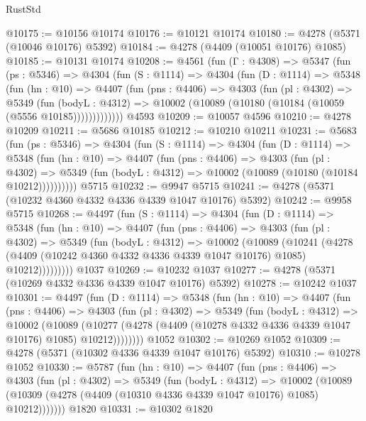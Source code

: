 \begin{lexlean}{RustStd}
\begin{coremodule}
{\begin{coremodule}
{{{{{{{{{{{{{{{{{{{{{{{{{{{{{{{{{{{@10175 := @10156 @10174
@10176 := @10121 @10174
@10180 := @4278 (@5371 (@10046 @10176) @5392)
@10184 := @4278 (@4409 (@10051 @10176) @1085)
@10185 := @10131 @10174
@10208 := @4561
    (fun (Γ : @4308) =>
    @5347
      (fun (ps : @5346) =>
      @4304
        (fun (S : @1114) =>
        @4304
          (fun (D : @1114) =>
          @5348
            (fun (hn : @10) =>
            @4407
              (fun (pns : @4406) =>
              @4303
                (fun (pl : @4302) =>
                @5349
                  (fun (bodyL : @4312) =>
                  @10002 (@10089 (@10180 (@10184 (@10059 (@5556 @10185)))))))))))))
    @4593
@10209 := @10057 @4596
@10210 := @4278 @10209
@10211 := @5686 @10185
@10212 := @10210 @10211
@10231 := @5683
    (fun (ps : @5346) =>
    @4304
      (fun (S : @1114) =>
      @4304
        (fun (D : @1114) =>
        @5348
          (fun (hn : @10) =>
          @4407
            (fun (pns : @4406) =>
            @4303
              (fun (pl : @4302) =>
              @5349 (fun (bodyL : @4312) => @10002 (@10089 (@10180 (@10184 @10212))))))))))
    @5715
@10232 := @9947 @5715
@10241 := @4278 (@5371 (@10232 @4360 @4332 @4336 @4339 @1047 @10176) @5392)
@10242 := @9958 @5715
@10268 := @4497
    (fun (S : @1114) =>
    @4304
      (fun (D : @1114) =>
      @5348
        (fun (hn : @10) =>
        @4407
          (fun (pns : @4406) =>
          @4303
            (fun (pl : @4302) =>
            @5349
              (fun (bodyL : @4312) =>
              @10002
                (@10089
                  (@10241
                    (@4278
                      (@4409 (@10242 @4360 @4332 @4336 @4339 @1047 @10176) @1085)
                      @10212)))))))))
    @1037
@10269 := @10232 @1037
@10277 := @4278 (@5371 (@10269 @4332 @4336 @4339 @1047 @10176) @5392)
@10278 := @10242 @1037
@10301 := @4497
    (fun (D : @1114) =>
    @5348
      (fun (hn : @10) =>
      @4407
        (fun (pns : @4406) =>
        @4303
          (fun (pl : @4302) =>
          @5349
            (fun (bodyL : @4312) =>
            @10002
              (@10089
                (@10277 (@4278 (@4409 (@10278 @4332 @4336 @4339 @1047 @10176) @1085) @10212))))))))
    @1052
@10302 := @10269 @1052
@10309 := @4278 (@5371 (@10302 @4336 @4339 @1047 @10176) @5392)
@10310 := @10278 @1052
@10330 := @5787
    (fun (hn : @10) =>
    @4407
      (fun (pns : @4406) =>
      @4303
        (fun (pl : @4302) =>
        @5349
          (fun (bodyL : @4312) =>
          @10002
            (@10089 (@10309 (@4278 (@4409 (@10310 @4336 @4339 @1047 @10176) @1085) @10212)))))))
    @1820
@10331 := @10302 @1820
}}}}}}}}}}}}}}}}}}}}}}}}}}}}}}}}}}}
\end{coremodule}}
\end{coremodule}
\end{lexlean}
